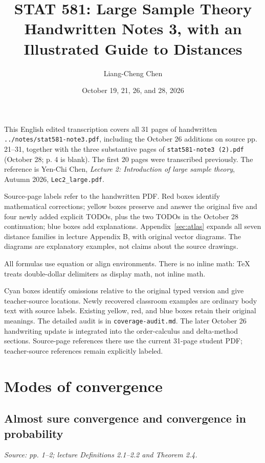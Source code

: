 \documentclass[12pt]{article}
\title{STAT 581: Large Sample Theory\\\large Handwritten Notes 3, with an Illustrated Guide to Distances}
\author{Liang-Cheng Chen}
\date{October 19, 21, 26, and 28, 2026}
\begin{document}
\maketitle
\begin{remarkbox}
\raggedright
This English edited transcription covers all 31 pages of handwritten
\texttt{../notes/stat581-note3.pdf}, including the October 26 additions
on source pp. 21--31, together with the three substantive pages of
\texttt{stat581-note3 (2).pdf} (October 28; p. 4 is blank).
The first 20 pages were transcribed previously.
The reference is Yen-Chi Chen, \emph{Lecture 2: Introduction of large sample
 theory}, Autumn 2026, \texttt{Lec2\_large.pdf}.

Source-page labels refer to the handwritten PDF. Red boxes identify
mathematical corrections; yellow boxes preserve and answer the original five and four newly added explicit
TODOs, plus the two TODOs in the October 28 continuation; blue boxes add explanations. Appendix~\ref{sec:atlas} expands all seven
distance families in lecture Appendix B, with original vector diagrams.
The diagrams are explanatory examples, not claims about the source drawings.

All formulas use equation or align environments. There is no inline math:
TeX treats double-dollar delimiters as display math, not inline math.
\end{remarkbox}
\begin{remarkbox}
Cyan boxes identify omissions relative to the original typed version and give
teacher-source locations. Newly recovered classroom examples are ordinary
body text with source labels. Existing yellow, red, and blue boxes retain
their original meanings. The detailed audit is in \texttt{coverage-audit.md}.
The later October 26 handwriting update is integrated into the order-calculus
and delta-method sections. Source-page references there use the current
31-page student PDF; teacher-source references remain explicitly labeled.
\end{remarkbox}
\begingroup
\small
\tableofcontents
\endgroup
\clearpage

\section{Modes of convergence}
\subsection{Almost sure convergence and convergence in probability}
\textit{Source: pp. 1--2; lecture Definitions 2.1--2.2 and Theorem 2.4.}
\end{document}

